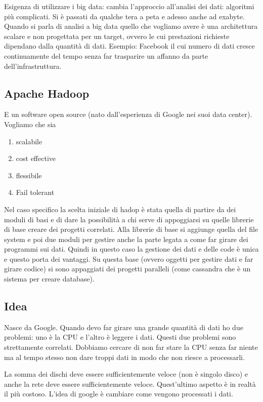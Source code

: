 \documentclass[italian,]{article}
\providecommand{\tightlist}{%
  \setlength{\itemsep}{0pt}\setlength{\parskip}{0pt}}
\begin{document}
Esigenza di utilizzare i big data: cambia l'approccio all'analisi dei
dati: algoritmi più complicati. Si è passati da qualche tera a peta e
adesso anche ad exabyte. Quando si parla di analisi a big data quello
che vogliamo avere è una architettura scalare e non progettata per un
target, ovvero le cui prestazioni richieste dipendano dalla quantità di
dati. Esempio: Facebook il cui numero di dati cresce continuamente del
tempo senza far trasparire un affanno da parte dell'infrastruttura.

\subsection{Apache Hadoop}\label{apache-hadoop}

E un software open source (nato dall'esperienza di Google nei suoi data
center). Vogliamo che sia

\begin{enumerate}
\def\labelenumi{\arabic{enumi}.}
\tightlist
\item
  scalabile
\item
  cost effective
\item
  flessibile
\item
  Fail tolerant
\end{enumerate}

Nel caso specifico la scelta iniziale di hadop è stata quella di partire
da dei moduli di basi e di dare la possibilità a chi serve di
appoggiarsi su quelle librerie di base creare dei progetti correlati.
Alla librerie di base si aggiunge quella del file system e poi due
moduli per gestire anche la parte legata a come far girare dei programmi
sui dati. Quindi in questo caso la gestione dei dati e delle code è
unica e questo porta dei vantaggi. Su questa base (ovvero oggetti per
gestire dati e far girare codice) si sono appaggiati dei progetti
paralleli (come cassandra che è un sistema per creare database).
\subsection{Idea} Nasce da Google. Quando devo far girare una grande
quantità di dati ho due problemi: uno è la CPU e l'altro è leggere i
dati. Questi due problemi sono strettamente correlati. Dobbiamo cercare
di non far stare la CPU senza far niente ma al tempo stesso non dare
troppi dati in modo che non riesce a processarli.

La somma dei dischi deve essere sufficientemente veloce (non è singolo
disco) e anche la rete deve essere sufficientemente veloce. Quest'ultimo
aspetto è in realtà il più costoso. L'idea di google è cambiare come
vengono processati i dati.
\end{document}
